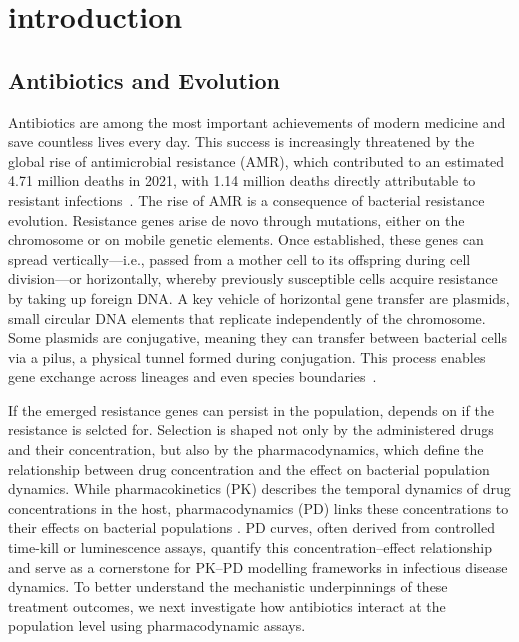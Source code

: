\documentclass[../main.tex]{subfiles}
\begin{document}
\chapter{introduction}

\section{Antibiotics and Evolution}
Antibiotics are among the most important achievements of modern medicine and save countless lives every day.
This success is increasingly threatened by the global rise of antimicrobial resistance (AMR), which contributed to an estimated 4.71 million deaths in 2021, with 1.14 million deaths directly attributable to resistant infections~\cite{Naghavi2024}.
The rise of AMR is a consequence of bacterial resistance evolution.
Resistance genes arise de novo through mutations, either on the chromosome or on mobile genetic elements.
Once established, these genes can spread vertically—i.e., passed from a mother cell to its offspring during cell division—or horizontally, whereby previously susceptible cells acquire resistance by taking up foreign DNA.
A key vehicle of horizontal gene transfer are plasmids, small circular DNA elements that replicate independently of the chromosome.
Some plasmids are conjugative, meaning they can transfer between bacterial cells via a pilus, a physical tunnel formed during conjugation.
This process enables gene exchange across lineages and even species boundaries~\cite{Frost2005, Smillie2010}.

If the emerged resistance genes can persist in the population, depends on if the resistance is selcted for.
Selection is shaped not only by the administered drugs and their concentration, but also by the pharmacodynamics, which define the relationship between drug concentration and the effect on bacterial population dynamics.
While pharmacokinetics (PK) describes the temporal dynamics of drug concentrations in the host, pharmacodynamics (PD) links these concentrations to their effects on bacterial populations \cite{Regoes2004}.
PD curves, often derived from controlled time-kill or luminescence assays, quantify this concentration–effect relationship and serve as a cornerstone for PK–PD modelling frameworks in infectious disease dynamics.
To better understand the mechanistic underpinnings of these treatment outcomes, we next investigate how antibiotics interact at the population level using pharmacodynamic assays.
\end{document}

